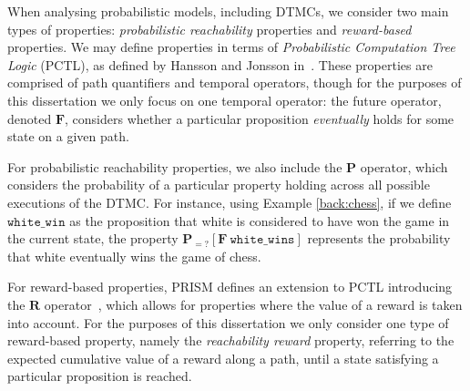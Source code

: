 When analysing probabilistic models, including DTMCs, we consider two main types of properties: \emph{probabilistic reachability} properties and \emph{reward-based} properties. We may define properties in terms of \emph{Probabilistic Computation Tree Logic} (PCTL), as defined by Hansson and Jonsson in~\cite{hansson_logic_1994}. These properties are comprised of path quantifiers and temporal operators, though for the purposes of this dissertation we only focus on one temporal operator: the future operator, denoted $\mathbf{F}$, considers whether a particular proposition \emph{eventually} holds for some state on a given path.


For probabilistic reachability properties, we also include the $\mathbf{P}$ operator, which considers the probability of a particular property holding across all possible executions of the DTMC. For instance, using Example \ref{back:chess}, if we define $\mathtt{white\_win}$ as the proposition that white is considered to have won the game in the current state, the property $\mathbf{P}_{=?} [\mathbf{F}\ \mathtt{white\_wins}]$ represents the probability that white eventually wins the game of chess. 


For reward-based properties, PRISM defines an extension to PCTL introducing the $\mathbf{R}$ operator~\cite{kwiatkowska_stochastic_2007}, which allows for properties where the value of a reward is taken into account. For the purposes of this dissertation we only consider one type of reward-based property, namely the \emph{reachability reward} property, referring to the expected cumulative value of a reward along a path, until a state satisfying a particular proposition is reached.

